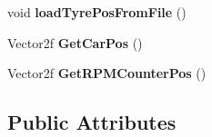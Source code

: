\begin{DoxyCompactItemize}
\item 
\hypertarget{class_game_a16d92220f4808914017486e36c7e44cb}{}void {\bfseries load\+Tyre\+Pos\+From\+File} ()\label{class_game_a16d92220f4808914017486e36c7e44cb}

\item 
\hypertarget{class_game_aac1c9b79494aa3ec9564134bcbe885da}{}Vector2f {\bfseries Get\+Car\+Pos} ()\label{class_game_aac1c9b79494aa3ec9564134bcbe885da}

\item 
\hypertarget{class_game_a1ab3e29bdade1f0a90723878a34abef5}{}Vector2f {\bfseries Get\+R\+P\+M\+Counter\+Pos} ()\label{class_game_a1ab3e29bdade1f0a90723878a34abef5}

\end{DoxyCompactItemize}
\subsection*{Public Attributes}
